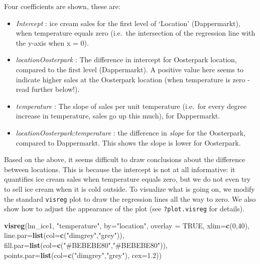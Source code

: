 \documentclass[]{book}
\newenvironment{Shaded}{\begin{snugshade}}{\end{snugshade}}
\newcommand{\DataTypeTok}[1]{\textcolor[rgb]{0.13,0.29,0.53}{#1}}
\newcommand{\DecValTok}[1]{\textcolor[rgb]{0.00,0.00,0.81}{#1}}
\newcommand{\FloatTok}[1]{\textcolor[rgb]{0.00,0.00,0.81}{#1}}
\newcommand{\KeywordTok}[1]{\textcolor[rgb]{0.13,0.29,0.53}{\textbf{#1}}}
\newcommand{\NormalTok}[1]{#1}
\newcommand{\OtherTok}[1]{\textcolor[rgb]{0.56,0.35,0.01}{#1}}
\newcommand{\StringTok}[1]{\textcolor[rgb]{0.31,0.60,0.02}{#1}}
\providecommand{\tightlist}{%
  \setlength{\itemsep}{0pt}\setlength{\parskip}{0pt}}
\begin{document}
Four coefficients are shown, these are:

\begin{itemize}
\tightlist
\item
  \emph{Intercept} : ice cream sales for the first level of `Location' (Dappermarkt), when temperature equals zero (i.e.~the intersection of the regression line with the y-axis when x = 0).
\item
  \emph{locationOosterpark} : The difference in intercept for Oosterpark location, compared to the first level (Dappermarkt). A positive value here seems to indicate higher sales at the Oosterpark location (when temperature is zero - read further below!).
\item
  \emph{temperature} : The slope of sales per unit temperature (i.e.~for every degree increase in temperature, sales go up this much), for Dappermarkt.
\item
  \emph{locationOosterpark:temperature} : the difference in \emph{slope} for the Oosterpark, compared to Dappermarkt. This shows the slope is lower for Oosterpark.
\end{itemize}

Based on the above, it seems difficult to draw conclusions about the difference between locations. This is because the intercept is not at all informative: it quantifies ice cream sales when temperature equals zero, but we do not even try to sell ice cream when it is cold outside. To visualize what is going on, we modify the standard \texttt{visreg} plot to draw the regression lines all the way to zero. We also show how to adjust the appearance of the plot (see \texttt{?plot.visreg} for details).

\begin{Shaded}
\begin{Highlighting}[]
\KeywordTok{visreg}\NormalTok{(lm_ice1, }\StringTok{"temperature"}\NormalTok{, }\DataTypeTok{by=}\StringTok{"location"}\NormalTok{, }
       \DataTypeTok{overlay =} \OtherTok{TRUE}\NormalTok{, }\DataTypeTok{xlim=}\KeywordTok{c}\NormalTok{(}\DecValTok{0}\NormalTok{,}\DecValTok{40}\NormalTok{),}
       \DataTypeTok{line.par=}\KeywordTok{list}\NormalTok{(}\DataTypeTok{col=}\KeywordTok{c}\NormalTok{(}\StringTok{"dimgrey"}\NormalTok{,}\StringTok{"grey"}\NormalTok{)),}
       \DataTypeTok{fill.par=}\KeywordTok{list}\NormalTok{(}\DataTypeTok{col=}\KeywordTok{c}\NormalTok{(}\StringTok{"#BEBEBE80"}\NormalTok{,}\StringTok{"#BEBEBE80"}\NormalTok{)),}
       \DataTypeTok{points.par=}\KeywordTok{list}\NormalTok{(}\DataTypeTok{col=}\KeywordTok{c}\NormalTok{(}\StringTok{"dimgrey"}\NormalTok{,}\StringTok{"grey"}\NormalTok{), }\DataTypeTok{cex=}\FloatTok{1.2}\NormalTok{))}
\end{Highlighting}
\end{Shaded}
\end{document}
